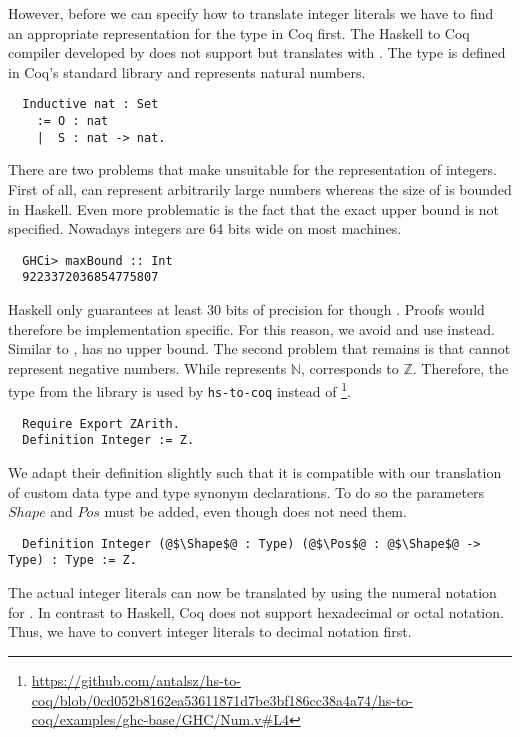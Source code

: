 However, before we can specify how to translate integer literals we have to find an appropriate representation for the type  in Coq first.
The Haskell to Coq compiler developed by \cite{Jessen:2019} does not support  but translates  with .
The type  is defined in Coq's standard library and represents natural numbers.
\begin{verbatim}
  Inductive nat : Set
    := O : nat
    |  S : nat -> nat.
\end{verbatim}
There are two problems that make  unsuitable for the representation of integers. First of all,  can represent arbitrarily large numbers whereas the size of  is bounded in Haskell.
Even more problematic is the fact that the exact upper bound is not specified.
Nowadays integers are 64 bits wide on most machines.
\begin{verbatim}
  GHCi> maxBound :: Int
  9223372036854775807
\end{verbatim}
Haskell only guarantees at least 30 bits of precision for  though \cite[p.~181]{Marlow:2010}.
Proofs would therefore be implementation specific.
For this reason, we avoid  and use  instead.
Similar to ,  has no upper bound.
The second problem that remains is that  cannot represent negative numbers.
While  represents $\mathbb{N}$,  corresponds to $\mathbb{Z}$.
Therefore, the type  from the  library is used by \texttt{hs-to-coq} instead of  \footnote{\url{https://github.com/antalsz/hs-to-coq/blob/0cd052b8162ea53611871d7be3bf186cc38a4a74/hs-to-coq/examples/ghc-base/GHC/Num.v\#L4}}.
\begin{verbatim}
  Require Export ZArith.
  Definition Integer := Z.
\end{verbatim}
We adapt their definition slightly such that it is compatible with our translation of custom data type and type synonym declarations.
To do so the parameters $Shape$ and $Pos$ must be added, even though  does not need them.
\begin{verbatim}
  Definition Integer (@$\Shape$@ : Type) (@$\Pos$@ : @$\Shape$@ -> Type) : Type := Z.
\end{verbatim}
The actual integer literals can now be translated by using the numeral notation for .
In contrast to Haskell, Coq does not support hexadecimal or octal notation.
Thus, we have to convert integer literals to decimal notation first.
